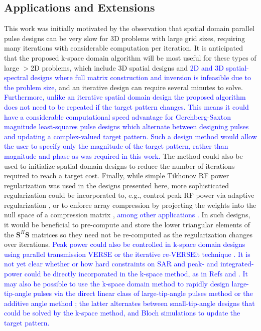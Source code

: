 \subsection*{Applications and Extensions}
This work was initially motivated by the observation that spatial domain parallel pulse designs can be very slow
for 3D problems with large grid sizes, 
requiring many iterations with considerable computation per iteration. 
It is anticipated that the proposed k-space domain algorithm will be most useful for these types of large $>$2D problems,
which include 3D spatial designs \cite{malik2012tailored,davids2016fast} 
and \textcolor{blue}{2D and 3D spatial-spectral designs \cite{stenger2000three,setsompop2009,Malik:2010aa,yang2010four}
where full matrix construction and inversion is infeasible due to the problem size, }
and an iterative design can require several minutes to solve. 
\textcolor{blue}{Furthermore, unlike an iterative spatial domain design the proposed algorithm does not need to be repeated if the target pattern changes.
This means it could have a considerable computational speed advantage for Gerchberg-Saxton magnitude least-squares pulse designs \cite{setsompop2008magnitude,malik:mrm:2015}
which alternate between designing pulses and updating a complex-valued target pattern.
Such a design method would allow the user to specify only the magnitude of the target pattern, 
rather than magnitude and phase as was required in this work.}
The method could also be used to initialize spatial-domain designs to reduce the number of iterations required to reach a target cost. 
Finally, while simple Tikhonov RF power regularization was used in the designs presented here,
more sophisticated regularization could be incorporated to, 
e.g., control peak RF power via adaptive regularization \cite{Yip:2005:Magn-Reson-Med:16155881},
or to enforce array compression by projecting the weights into the null space of a compression matrix \cite{cao2016array},
\textcolor{blue}{among other applications \cite{padormo:2016,deniz:2019}.} 
In such designs, it would be beneficial to pre-compute and store the lower triangular elements of the $\bm{S}^H\bm{S}$ matrices
so they need not be re-computed as the regularization changes over iterations.  
\textcolor{blue}{Peak power could also be controlled in k-space domain designs using parallel transmission 
VERSE \cite{Lee:2011:MRM} or the iterative re-VERSEit technique \cite{lee2009tod}.} 
\textcolor{blue}{It is not yet clear whether or how hard constraints on SAR and 
peak- and integrated-power could be directly incorporated in the k-space method, as in Refs \cite{brunner2010optimal} and \cite{hoyos:tmi:2014}. }
\textcolor{blue}{It may also be possible to use the k-space domain method to rapidly design large-tip-angle pulses via the direct linear class of large-tip-angle pulses method \cite{Xu:2008aa} or the additive angle method \cite{grissom:mrm:2008}; 
the latter alternates between small-tip-angle designs that could be solved by the k-space method, 
and Bloch simulations to update the target pattern.} 


